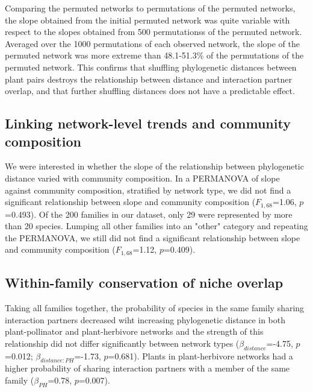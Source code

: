 \documentclass[12pt]{article}
\begin{document}
\begin{spacing}{1.5}
    Comparing the permuted networks to permutations of the permuted networks, the slope obtained from the initial permuted network was quite variable with respect to the slopes obtained from 500 permutationss of the permuted network. Averaged over the 1000 permutations of each observed network, the slope of the permuted network was more extreme than 48.1-51.3\% of the permutations of the permuted network. This confirms that shuffling phylogenetic distances between plant pairs destroys the relationship between distance and interaction partner overlap, and that further shuffling distances does not have a predictable effect.


  \subsection*{Linking network-level trends and community composition} 

    We were interested in whether the slope of the relationship between phylogenetic distance varied with community composition. In a PERMANOVA of slope against community composition, stratified by network type, we did not find a significant relationship between slope and community composition ($F_{1,68}$=1.06, $p$=0.493). Of the 200 families in our dataset, only 29 were represented by more than 20 species. Lumping all other families into an "other" category and repeating the PERMANOVA, we still did not find a significant relationship between slope and community composition ($F_{1,68}$=1.12, $p$=0.409). 


  \subsection*{Within-family conservation of niche overlap} 

    Taking all families together, the probability of species in the same family sharing interaction partners decreased wiht increasing phylogenetic distance in both plant-pollinator and plant-herbivore networks and the strength of this relationship did not differ significantly between network types ($\beta_{distance}$=-4.75, $p$=0.012; $\beta_{distance:PH}$=-1.73, $p$=0.681). Plants in plant-herbivore networks had a higher probability of sharing interaction partners with a member of the same family ($\beta_{PH}$=0.78, $p$=0.007).



\end{spacing}
\end{document}
